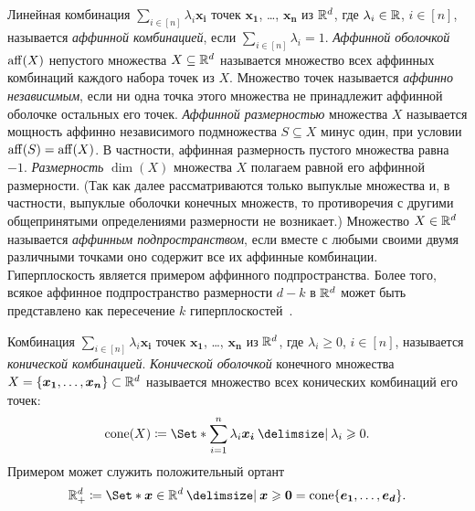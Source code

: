 Линейная комбинация $\sum_{i\in[n]} \lambda_i \bm{x_i}$ точек $\bm{x_1}$, \dots, $\bm{x_n}$ из $\mathbb{R}^d$,
где $\lambda_i \in \mathbb{R}$, $i\in[n]$,
называется \emph{аффинной комбинацией},
если $\sum_{i\in[n]} \lambda_i = 1$.
\emph{Аффинной оболочкой} $\operatorname{aff}(X)$ непустого множества $X \subseteq \mathbb{R}^d$ называется множество всех аффинных комбинаций каждого набора точек из $X$.
Множество точек называется \emph{аффинно независимым}, если ни одна точка этого множества не принадлежит аффинной оболочке остальных его точек.
\emph{Аффинной размерностью} множества $X$ называется мощность аффинно независимого подмножества $S \subseteq X$ минус один, при условии $\operatorname{aff}(S) = \operatorname{aff}(X)$. В частности, аффинная размерность пустого множества равна $-1$.
\emph{Размерность} $\dim(X)$ множества $X$ полагаем равной его аффинной размерности. (Так как далее рассматриваются только выпуклые множества и, в частности, выпуклые оболочки конечных множеств, то противоречия с другими общепринятыми определениями размерности не возникает.)
Множество $X \in \mathbb{R}^d$ называется \emph{аффинным подпространством}, если вместе с любыми своими двумя различными точками оно содержит все их аффинные комбинации.
Гиперплоскость является примером аффинного подпространства.
Более того, всякое аффинное подпространство размерности $d-k$ в $\mathbb{R}^d$ может быть представлено как пересечение $k$ гиперплоскостей~\cite{Emelichev:1981}.

Комбинация $\sum_{i\in[n]} \lambda_i \bm{x_i}$ точек $\bm{x_1}$, \dots, $\bm{x_n}$ из $\mathbb{R}^d$,
где $\lambda_i \ge 0$, $i\in[n]$,
называется \emph{конической комбинацией}.
\emph{Конической оболочкой} конечного множества $X = \{\bm{x_1}, \dots, \bm{x_n}\} \subset \mathbb{R}^d$ называется множество всех конических комбинаций его точек:
\[
\cone(X) \coloneqq \Set*{\sum_{i=1}^n \lambda_i \bm{x_i} \given \lambda_i \ge 0}.
\]
Примером может служить положительный ортант
\[
\R^d_+ \coloneqq \Set*{\bm{x} \in \R^d \given \bm{x} \ge \bm{0}} = \cone\{\bm{e_1},\dots,\bm{e_d}\}.
\]

